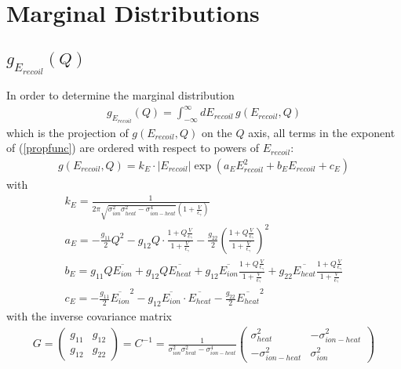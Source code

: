 \section{Marginal Distributions}
\subsection{$g_{E_{recoil}}(Q)$}
In order to determine the marginal distribution
\begin{gather}
g_{E_{recoil}}(Q) = \int_{-\infty}^\infty dE_{recoil} \, g(E_{recoil},Q)
\end{gather}
which is the projection of $g(E_{recoil},Q)$ on the $Q$ axis, 
all terms in the exponent of (\ref{propfunc}) are ordered 
with respect to powers of $E_{recoil}$:
\begin{gather}
g(E_{recoil},Q) = k_E \cdot \left| E_{recoil} \right|  \exp ( a_E E_{recoil}^2 +
b_E E_{recoil} + c_E ) \label{propfuncE}
\end{gather}
with
\begin{gather}
k_E = \frac{1}{2 \pi \sqrt{\sigma_{ion}^2 \sigma_{heat}^2 - \sigma_{ion-heat}^4}
 \left(1 + \frac{V}{\epsilon_\gamma}\right)} \\
a_E = - \frac{g_{11}}{2} Q^2  - g_{12} Q \cdot
\frac{1 + Q \frac{V}{\epsilon_\gamma}}{1+ \frac{V}{\epsilon_\gamma}} 
- \frac{g_{22}}{2} \left( \frac{1 + Q \frac{V}{\epsilon_\gamma}}{1+ \frac{V}{\epsilon_\gamma}}  \right)^2 \\
b_E = g_{11} Q \overline{E_{ion}} + g_{12} Q \overline{E_{heat}}
 + g_{12} \overline{E_{ion}} 
\frac{1 + Q \frac{V}{\epsilon_\gamma}}{1+ \frac{V}{\epsilon_\gamma}} 
 + g_{22} \overline{E_{heat}} 
\frac{1 + Q \frac{V}{\epsilon_\gamma}}{1+ \frac{V}{\epsilon_\gamma}} \\
c_E = - \frac{g_{11}}{2} \overline{E_{ion}}^2 - g_{12} \overline{E_{ion}} \cdot
 \overline{E_{heat}} - \frac{g_{22}}{2} \overline{E_{heat}}^2
\end{gather}
with the inverse covariance matrix 
\begin{gather}
G = \begin{pmatrix} g_{11} & g_{12} \\ g_{12} & g_{22} \end{pmatrix}
= C^{-1} = \frac{1}{\sigma_{ion}^2 \sigma_{heat}^2 - \sigma_{ion-heat}^4}
\begin{pmatrix} \sigma_{heat}^2 & - \sigma_{ion-heat}^2 \\
- \sigma_{ion-heat}^2 & \sigma_{ion}^2 \end{pmatrix}
\end{gather}

